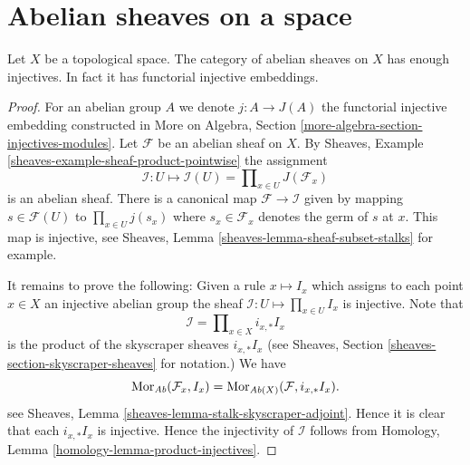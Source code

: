 \section{Abelian sheaves on a space}
\label{section-abelian-sheaves-space}


\begin{lemma}
\label{lemma-abelian-sheaves-space}
Let $X$ be a topological space.
The category of abelian sheaves on $X$ has enough injectives.
In fact it has functorial injective embeddings.
\end{lemma}

\begin{proof}
For an abelian group $A$ we denote $j : A \to J(A)$ the functorial
injective embedding constructed in
More on Algebra, Section \ref{more-algebra-section-injectives-modules}.
Let $\mathcal{F}$ be an abelian sheaf on $X$.
By Sheaves, Example \ref{sheaves-example-sheaf-product-pointwise}
the assignment
$$
\mathcal{I} : U \mapsto
\mathcal{I}(U) = \prod\nolimits_{x\in U} J(\mathcal{F}_x)
$$
is an abelian sheaf. There is a canonical map $\mathcal{F} \to \mathcal{I}$
given by mapping $s \in \mathcal{F}(U)$ to $\prod_{x \in U} j(s_x)$
where $s_x \in \mathcal{F}_x$ denotes the germ of $s$ at $x$.
This map is injective, see
Sheaves, Lemma \ref{sheaves-lemma-sheaf-subset-stalks}
for example.

\medskip\noindent
It remains to prove the following: Given a rule
$x \mapsto I_x$ which assigns to each point $x \in X$ an injective
abelian group the sheaf $\mathcal{I} : U \mapsto \prod_{x \in U} I_x$
is injective. Note that
$$
\mathcal{I} = \prod\nolimits_{x \in X} i_{x, *}I_x
$$
is the product of the skyscraper sheaves $i_{x, *}I_x$ (see
Sheaves, Section \ref{sheaves-section-skyscraper-sheaves} for notation.)
We have
$$
\mathop{\mathrm{Mor}}\nolimits_{\textit{Ab}}(\mathcal{F}_x, I_x)
=
\mathop{\mathrm{Mor}}\nolimits_{\textit{Ab}(X)}(\mathcal{F}, i_{x, *}I_x).
$$
see Sheaves, Lemma \ref{sheaves-lemma-stalk-skyscraper-adjoint}. Hence it is
clear that each $i_{x, *}I_x$ is injective. Hence the injectivity of
$\mathcal{I}$ follows from
Homology, Lemma \ref{homology-lemma-product-injectives}.
\end{proof}


